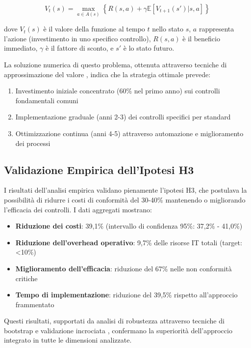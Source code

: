 \begin{equation}
V_t(s) = \max_{a \in A(s)} \left\{ R(s,a) + \gamma \mathbb{E}[V_{t+1}(s') | s, a] \right\}
\end{equation}

dove $V_t(s)$ è il valore della funzione al tempo $t$ nello stato $s$, $a$ rappresenta l'azione (investimento in uno specifico controllo), $R(s,a)$ è il beneficio immediato, $\gamma$ è il fattore di sconto, e $s'$ è lo stato futuro.

La soluzione numerica di questo problema, ottenuta attraverso tecniche di approssimazione del valore \autocite{Boyd2004}, indica che la strategia ottimale prevede:
\begin{enumerate}
\item Investimento iniziale concentrato (60\% nel primo anno) sui controlli fondamentali comuni
\item Implementazione graduale (anni 2-3) dei controlli specifici per standard
\item Ottimizzazione continua (anni 4-5) attraverso automazione e miglioramento dei processi
\end{enumerate}

\subsection{\texorpdfstring{\textbf{Validazione Empirica dell'Ipotesi H3}}{4.6.3 - Validazione Empirica dell'Ipotesi H3}}

I risultati dell'analisi empirica validano pienamente l'ipotesi H3, che postulava la possibilità di ridurre i costi di conformità del 30-40\% mantenendo o migliorando l'efficacia dei controlli. I dati aggregati mostrano:

\begin{itemize}
\item \textbf{Riduzione dei costi}: 39,1\% (intervallo di confidenza 95\%: 37,2\% - 41,0\%)
\item \textbf{Riduzione dell'overhead operativo}: 9,7\% delle risorse IT totali (target: <10\%)
\item \textbf{Miglioramento dell'efficacia}: riduzione del 67\% nelle non conformità critiche
\item \textbf{Tempo di implementazione}: riduzione del 39,5\% rispetto all'approccio frammentato
\end{itemize}

Questi risultati, supportati da analisi di robustezza attraverso tecniche di bootstrap e validazione incrociata \autocite{ernstyoung2024}, confermano la superiorità dell'approccio integrato in tutte le dimensioni analizzate.

